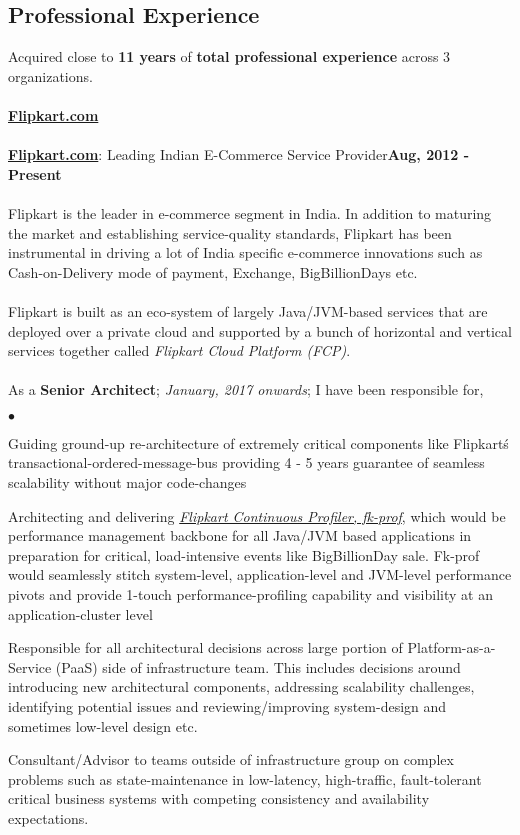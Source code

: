 \documentclass[margin,line]{res}
\newenvironment{list2}{
  \begin{list}{$\bullet$}{%
      \setlength{\itemsep}{0in}
      \setlength{\parsep}{0in} \setlength{\parskip}{0in}
      \setlength{\topsep}{0in} \setlength{\partopsep}{0in} 
      \setlength{\leftmargin}{0.2in}}}{\end{list}}
\begin{document}
\begin{resume}
\section{\sc Professional Experience}
\vspace{.4cm}
Acquired close to {\bf 11 years} of {\bf total professional experience} across 3 organizations.\\
\\
{\underline {\bf Flipkart.com}}\\
\\
\href{https://www.flipkart.com/}{\bf Flipkart.com}: Leading Indian E-Commerce Service Provider\hfill {\bf Aug, 2012 - Present}\\
\vspace{-.2cm}\\
Flipkart is the leader in e-commerce segment in India. In addition to maturing the market and establishing service-quality standards, Flipkart has been instrumental in driving a lot of India specific e-commerce innovations such as Cash-on-Delivery mode of payment, Exchange, BigBillionDays etc.\\
\\
Flipkart is built as an eco-system of largely Java/JVM-based services that are deployed over a private cloud and supported by a bunch of horizontal and vertical services together called {\em Flipkart Cloud Platform (FCP)}.\\
\\
As a {\bf Senior Architect}; {\em January, 2017 onwards}; I have been responsible for,\\
\begin{list2}
\item Guiding ground-up re-architecture of extremely critical components like Flipkart\'s transactional-ordered-message-bus providing 4 - 5 years guarantee of seamless scalability without major code-changes
\item Architecting and delivering \href{https://github.com/Flipkart/fk-prof}{\em Flipkart Continuous Profiler, fk-prof}, which would be performance management backbone for all Java/JVM based applications in preparation for critical, load-intensive events like BigBillionDay sale. Fk-prof would seamlessly stitch system-level, application-level and JVM-level performance pivots and provide 1-touch performance-profiling capability and visibility at an application-cluster level
\item Responsible for all architectural decisions across large portion of Platform-as-a-Service (PaaS) side of infrastructure team. This includes decisions around introducing new architectural components, addressing scalability challenges, identifying potential issues and reviewing/improving system-design and sometimes low-level design etc.
\item Consultant/Advisor to teams outside of infrastructure group on complex problems such as state-maintenance in low-latency, high-traffic, fault-tolerant critical business systems with competing consistency and availability expectations.
\end{list2}


\end{resume}
\end{document}
